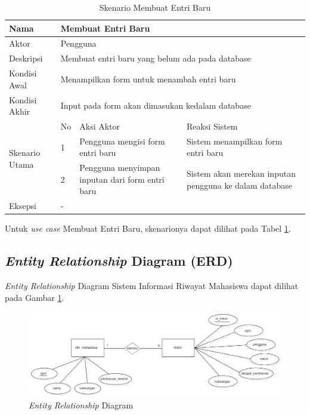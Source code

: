 \begin{table}[h]
\centering
\caption[Tabel Skenario Membuat Entri Baru]{Skenario Membuat Entri Baru}
\label{tab:skenarioentribaru}
\begin{tabular}{|p{1.4cm}|p{0.4cm}|p{2cm}|p{2cm}|p{2cm}|p{2cm}|}
\hline
Nama & \multicolumn{5}{p{8cm}|}{Membuat Entri Baru} \\ \hline
Aktor & \multicolumn{5}{p{8cm}|}{Pengguna} \\ \hline
Deskripsi & \multicolumn{5}{p{8cm}|}{Membuat entri baru yang belum ada pada
database} \\ \hline
Kondisi Awal & \multicolumn{5}{p{8cm}|}{Menampilkan form untuk menambah entri
baru} \\ \hline
Kondisi Akhir & \multicolumn{5}{p{8cm}|}{Input pada form akan dimasukan kedalam
database} \\ \hline
\multirow{3}{*}{\parbox{1.4cm}{Skenario Utama}} & No &
\multicolumn{2}{p{4cm}|}{Aksi Aktor} & \multicolumn{2}{p{4cm}|}{Reaksi Sistem}
\\ \cline{2-6}
& 1 & \multicolumn{2}{p{4cm}|}{Pengguna mengisi form entri baru} &
\multicolumn{2}{p{4cm}|}{Sistem menampilkan form entri baru} \\ \cline{2-6}
& 2 & \multicolumn{2}{p{4cm}|}{Pengguna menyimpan inputan dari form entri baru}
& \multicolumn{2}{p{4cm}|}{Sistem akan merekan inputan pengguna ke dalam
database} \\ \hline
Eksepsi & \multicolumn{5}{p{8cm}|}{-} \\ \hline
\end{tabular}
\end{table}

Untuk {\it use case} Membuat Entri Baru, skenarionya dapat dilihat pada Tabel
\ref{tab:skenarioentribaru}.

\subsection{{\it Entity Relationship} Diagram (ERD)}
{\it Entity Relationship} Diagram Sistem Informasi Riwayat Mahasiswa dapat
dilihat pada Gambar \ref{fig:erd}.

\begin{figure}[H]
\centering
\includegraphics[scale=0.4]{Gambar/ERD.png}
\caption[{\it Entity Relationship} Diagram]{{\it Entity Relationship} Diagram} 
\label{fig:erd}
\end{figure}

